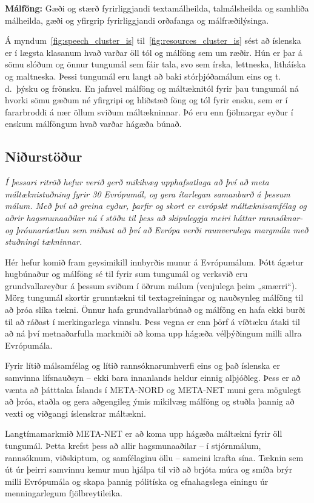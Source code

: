 \begin{multicols}{2}
\textbf{Málföng:} Gæði og stærð fyrirliggjandi textamálheilda, talmálsheilda og samhliða málheilda, gæði og yfirgrip fyrirliggjandi orðafanga og málfræðilýsinga. 

Á myndum~\ref{fig:speech_cluster_is} til~\ref{fig:resources_cluster_is} sést að íslenska er í lægsta klasanum hvað varðar öll tól og málföng sem um ræðir. Hún er þar á sömu slóðum og önnur tungumál sem fáir tala, svo sem írska, lettneska, litháíska og maltneska. Þessi tungumál eru langt að baki stórþjóðamálum eins og t.\,d.~þýsku og frönsku. En jafnvel málföng og máltæknitól fyrir þau tungumál ná hvorki sömu gæðum né yfirgripi og hliðstæð föng og tól fyrir ensku, sem er í fararbroddi á nær öllum sviðum máltækninnar. Þó eru enn fjölmargar eyður í enskum málföngum hvað varðar hágæða búnað.

\subsection{Niðurstöður}

\emph{Í þessari ritröð hefur verið gerð mikilvæg upphafsatlaga að því að meta máltæknistuðning fyrir 30 Evrópumál, og gera ítarlegan samanburð á þessum málum. Með því að greina eyður, þarfir og skort er evrópskt máltæknisamfélag og aðrir hagsmunaaðilar nú í stöðu til þess að skipuleggja meiri háttar rannsóknar- og þróunaráætlun sem miðast að því að Evrópa verði raunverulega margmála með stuðningi tækninnar.}

Hér hefur komið fram geysimikill innbyrðis munur á Evrópumálum. Þótt ágætur hugbúnaður og málföng sé til fyrir sum tungumál og verksvið eru grundvallareyður á þessum sviðum í öðrum málum (venjulega þeim „smærri“). Mörg tungumál skortir grunntækni til textagreiningar og nauðsynleg málföng til að þróa slíka tækni. Önnur hafa grundvallarbúnað og málföng en hafa ekki burði til að ráðast í merkingarlega vinnslu. Þess vegna er enn þörf á víðtæku átaki til að ná því metnaðarfulla markmiði að koma upp hágæða vélþýðingum milli allra Evrópumála.

Fyrir lítið málsamfélag og lítið rannsóknarumhverfi eins og það íslenska er samvinna lífsnauðsyn -- ekki bara innanlands heldur einnig alþjóðleg. Þess er að vænta að þátttaka Íslands í META-NORD og META-NET muni gera mögulegt að þróa, staðla og gera aðgengileg ýmis mikilvæg málföng og stuðla þannig að vexti og viðgangi íslenskrar máltækni. 

Langtímamarkmið META-NET er að koma upp hágæða máltækni fyrir öll tungumál. Þetta krefst þess að allir hagsmunaaðilar -- í stjórnmálum, rannsóknum, viðskiptum, og samfélaginu öllu -- sameini krafta sína. Tæknin sem út úr þeirri samvinnu kemur mun hjálpa til við að brjóta múra og smíða brýr milli Evrópumála og skapa þannig pólitíska og efnahagslega einingu úr menningarlegum fjölbreytileika.
\end{multicols}

